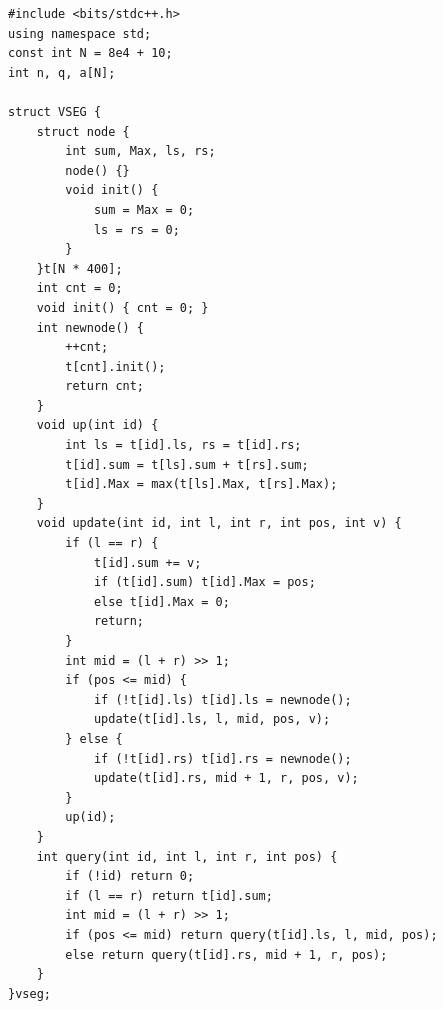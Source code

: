 \begin{lstlisting}
#include <bits/stdc++.h>
using namespace std;
const int N = 8e4 + 10;
int n, q, a[N];
 
struct VSEG {
    struct node {
        int sum, Max, ls, rs;
        node() {}
        void init() {
            sum = Max = 0;
            ls = rs = 0;
        }
    }t[N * 400];
    int cnt = 0;
    void init() { cnt = 0; }
    int newnode() {
        ++cnt;
        t[cnt].init();
        return cnt;
    }
    void up(int id) {
        int ls = t[id].ls, rs = t[id].rs;
        t[id].sum = t[ls].sum + t[rs].sum;
        t[id].Max = max(t[ls].Max, t[rs].Max);
    }
    void update(int id, int l, int r, int pos, int v) {
        if (l == r) {
            t[id].sum += v;
            if (t[id].sum) t[id].Max = pos;
            else t[id].Max = 0;
            return;
        }
        int mid = (l + r) >> 1;
        if (pos <= mid) {
            if (!t[id].ls) t[id].ls = newnode();
            update(t[id].ls, l, mid, pos, v);
        } else {
            if (!t[id].rs) t[id].rs = newnode();
            update(t[id].rs, mid + 1, r, pos, v);
        }
        up(id);
    }
    int query(int id, int l, int r, int pos) {
        if (!id) return 0;
        if (l == r) return t[id].sum;
        int mid = (l + r) >> 1;
        if (pos <= mid) return query(t[id].ls, l, mid, pos);
        else return query(t[id].rs, mid + 1, r, pos);
    }
}vseg;
 

\end{lstlisting}
